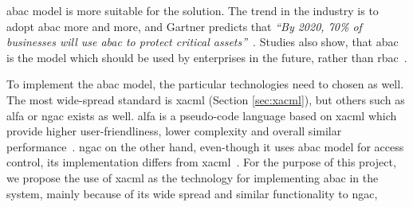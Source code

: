 \acrlong{abac} model is more suitable for the solution. The trend in the industry is to adopt \acrshort{abac} more and more, and Gartner predicts that \textit{``By 2020, 70\% of businesses will use \acrshort{abac} to protect critical assets''}~\cite{GartnerGartnerPredictions}. Studies also show, that \acrshort{abac} is the model which should be used by enterprises in the future, rather than \acrshort{rbac}~\cite{Fatima2016TowardsArgument}.

To implement the \acrshort{abac} model, the particular technologies need to chosen as well. The most wide-spread standard is \acrshort{xacml} (Section \ref{sec:xacml}), but others such as \acrfull{alfa} or \acrfull{ngac} exists as well. \acrshort{alfa} is a pseudo-code language based on \acrshort{xacml} which provide higher user-friendliness, lower complexity and overall similar performance~\cite{Mejri2016FormalPolicies}. \acrshort{ngac} on the other hand, even-though it uses \acrshort{abac} model for access control, its implementation differs from \acrshort{xacml}~\cite{Ferraiolo2016ANGAC}. For the purpose of this project, we propose the use of \acrshort{xacml} as the technology for implementing \acrshort{abac} in the system, mainly because of its wide spread and similar functionality to \acrshort{ngac},